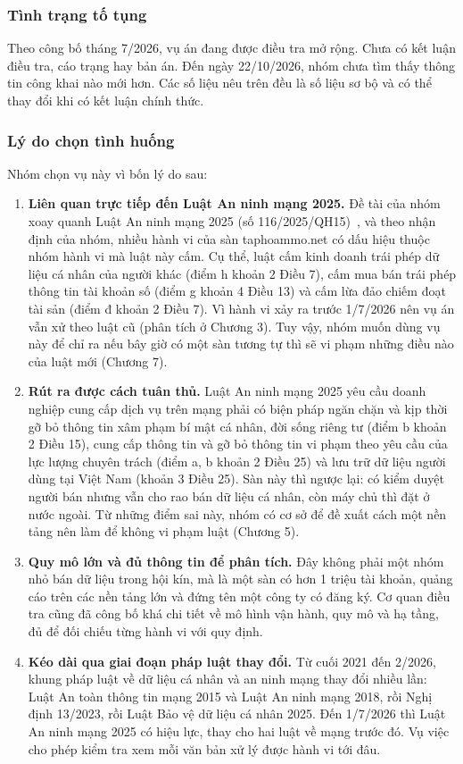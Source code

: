 \subsubsection{Tình trạng tố tụng}\label{sec:1.1.4}

Theo công bố tháng 7/2026, vụ án đang được điều tra mở rộng. Chưa có kết luận điều tra, cáo trạng hay bản án. Đến ngày 22/10/2026, nhóm chưa tìm thấy thông tin công khai nào mới hơn. Các số liệu nêu trên đều là số liệu sơ bộ và có thể thay đổi khi có kết luận chính thức.

\subsubsection{Lý do chọn tình huống}\label{sec:1.1.5}

Nhóm chọn vụ này vì bốn lý do sau:

\begin{enumerate}
\item \textbf{Liên quan trực tiếp đến Luật An ninh mạng 2025.} Đề tài của nhóm xoay quanh Luật An ninh mạng 2025 (số 116/2025/QH15)~\cite{luat-anm-2025}, và theo nhận định của nhóm, nhiều hành vi của sàn taphoammo.net có dấu hiệu thuộc nhóm hành vi mà luật này cấm. Cụ thể, luật cấm kinh doanh trái phép dữ liệu cá nhân của người khác (điểm h khoản 2 Điều 7), cấm mua bán trái phép thông tin tài khoản số (điểm g khoản 4 Điều 13) và cấm lừa đảo chiếm đoạt tài sản (điểm đ khoản 2 Điều 7). Vì hành vi xảy ra trước 1/7/2026 nên vụ án vẫn xử theo luật cũ (phân tích ở Chương 3). Tuy vậy, nhóm muốn dùng vụ này để chỉ ra nếu bây giờ có một sàn tương tự thì sẽ vi phạm những điều nào của luật mới (Chương 7).
\item \textbf{Rút ra được cách tuân thủ.} Luật An ninh mạng 2025 yêu cầu doanh nghiệp cung cấp dịch vụ trên mạng phải có biện pháp ngăn chặn và kịp thời gỡ bỏ thông tin xâm phạm bí mật cá nhân, đời sống riêng tư (điểm b khoản 2 Điều 15), cung cấp thông tin và gỡ bỏ thông tin vi phạm theo yêu cầu của lực lượng chuyên trách (điểm a, b khoản 2 Điều 25) và lưu trữ dữ liệu người dùng tại Việt Nam (khoản 3 Điều 25). Sàn này thì ngược lại: có kiểm duyệt người bán nhưng vẫn cho rao bán dữ liệu cá nhân, còn máy chủ thì đặt ở nước ngoài. Từ những điểm sai này, nhóm có cơ sở để đề xuất cách một nền tảng nên làm để không vi phạm luật (Chương 5).
\item \textbf{Quy mô lớn và đủ thông tin để phân tích.} Đây không phải một nhóm nhỏ bán dữ liệu trong hội kín, mà là một sàn có hơn 1 triệu tài khoản, quảng cáo trên các nền tảng lớn và đứng tên một công ty có đăng ký. Cơ quan điều tra cũng đã công bố khá chi tiết về mô hình vận hành, quy mô và hạ tầng, đủ để đối chiếu từng hành vi với quy định.
\item \textbf{Kéo dài qua giai đoạn pháp luật thay đổi.} Từ cuối 2021 đến 2/2026, khung pháp luật về dữ liệu cá nhân và an ninh mạng thay đổi nhiều lần: Luật An toàn thông tin mạng 2015 và Luật An ninh mạng 2018, rồi Nghị định 13/2023, rồi Luật Bảo vệ dữ liệu cá nhân 2025. Đến 1/7/2026 thì Luật An ninh mạng 2025 có hiệu lực, thay cho hai luật về mạng trước đó. Vụ việc cho phép kiểm tra xem mỗi văn bản xử lý được hành vi tới đâu.
\end{enumerate}
